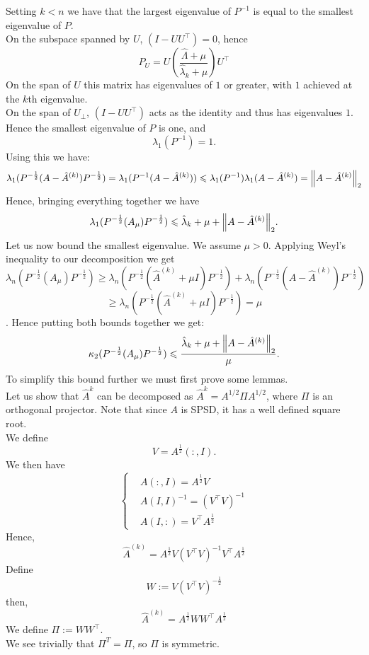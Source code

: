 \documentclass[12pt,letterpaper]{article}
\renewcommand{\le}{\leqslant}
\renewcommand{\ge}{\geqslant}
\newcommand{\inv}[1]{#1^{-1}}
\newcommand{\snorm}[1]{\norm{#1}_2}
\newcommand{\precond}[1]{P^{-\frac{1}{2}}(#1) P^{-\frac{1}{2}}}
\newcommand{\RPCPrecond}{\precond{A_\mu}}
\newcommand{\RPC}{\hat A^{(k)}}
\begin{document}
\begin{enumerate}
    Setting $k < n$ we have that the largest eigenvalue of $P^{-1}$ is equal to the smallest eigenvalue of $P$.\\
    On the subspace spanned by $U$, $(I-UU^\top)=0$, hence 
    $$
    P_U = U(\frac{\hat \Lambda + \mu }{\hat \lambda_k + \mu })U^\top
    $$
    On the span of $U$ this matrix has eigenvalues of $1$ or greater, with $1$ achieved at the $k$th eigenvalue.\\
    On the span of $U_\perp$, $(I-UU^\top)$ acts as the identity and thus has eigenvalues $1$. Hence the smallest eigenvalue of $P$ is one, and
    $$
    \lambda_1(P^{-1}) = 1.
    $$
    Using this we have:
    $$
    \lambda_1(\precond{A - \RPC})
    = \lambda_1(P^{-1}(A-\RPC)) 
    \le \lambda_1(P^{-1}) \lambda_1(A-\RPC)
    = \snorm{A-\RPC}
    $$
    Hence, bringing everything together we have 
    $$
    \lambda_1(\RPCPrecond) \le \hat \lambda_k + \mu + \snorm{A-\RPC} .
    $$
    Let us now bound the smallest eigenvalue. We assume $\mu > 0$. Applying Weyl's inequality to our decomposition we get 
    $$
    \lambda_n(\RPCPrecond) \ge \lambda_n(\precond{\RPC + \mu I}) +
    \lambda_n(\precond{A-\RPC})
    $$
    $$
    \ge \lambda_n(\precond{\RPC + \mu I})
    = \mu 
    $$.
    Hence putting both bounds together we get:
    \begin{equation}
    \label{kappa_bound_1}
        \kappa_2(\RPCPrecond) \le \frac{\hat \lambda_k + \mu + \snorm{A-\RPC}}{\mu}.
    \end{equation}
    To simplify this bound further we must first prove some lemmas.\\
    Let us show that $\hat A^{k}$ can be decomposed as $\hat A^{k} = A^{1/2}\Pi A^{1/2}$, where $\Pi$ is an orthogonal projector. Note that since $A$ is SPSD, it has a well defined square root.\\
    We define
    $$
    V = A^{\frac{1}{2}}(:,I).
    $$
    We then have
    $$
    \begin{cases}
        & A(:,I) = A^{\frac{1}{2}}V\\
        & \inv{A(I,I)} = (V^\top V)^{-1} \\
        & A(I,:) = V^\top A^\frac{1}{2}
    \end{cases}
    $$
    Hence,
    $$
    \RPC = A^{\frac{1}{2}}V\inv{(V^\top V)}V^\top A^{\frac{1}{2}}
    $$
    Define 
    $$
    W := V(V^\top V)^{-\frac{1}{2}}
    $$
    then,
    $$
    \RPC = A^{\frac{1}{2}}WW^\top  A^{\frac{1}{2}}
    $$
    We define $\Pi := WW^\top $. \\
    We see trivially that $\Pi^T = \Pi$, so $\Pi$ is symmetric.\\

\end{enumerate}
\end{document}
